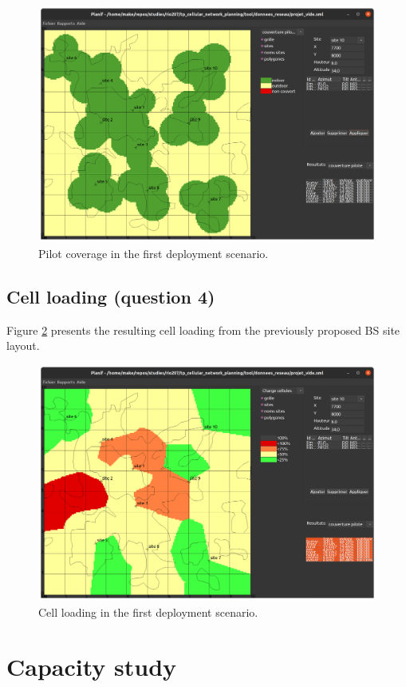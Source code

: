 \documentclass{article}
\begin{document}
\begin{figure}[!htb]
    \centering
    \includegraphics[width=12cm]{images/q3_pilot_coverage.png}
    \caption{Pilot coverage in the first deployment scenario.}
    \label{fig:q3_pilot_coverage}
\end{figure}

\subsection{Cell loading (question 4)}
Figure \ref{fig:q4_cell_loading} presents the resulting cell loading from the previously proposed BS site layout.

\begin{figure}[!htb]
    \centering
    \includegraphics[width=12cm]{images/q4_cell_loading.png}
    \caption{Cell loading in the first deployment scenario.}
    \label{fig:q4_cell_loading}
\end{figure}

\section{Capacity study}
\end{document}
